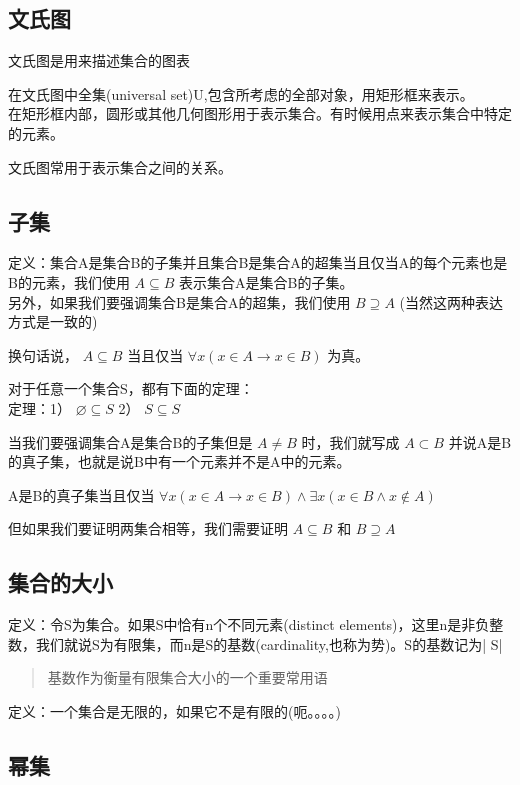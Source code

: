\documentclass[12pt,a4paper,oneside]{ctexart}
\begin{document}
\subsection*{文氏图}

文氏图是用来描述集合的图表

在文氏图中全集(universal set)U,包含所考虑的全部对象，用矩形框来表示。\\
在矩形框内部，圆形或其他几何图形用于表示集合。有时候用点来表示集合中特定的元素。

文氏图常用于表示集合之间的关系。

\subsection*{子集}

定义：集合A是集合B的子集并且集合B是集合A的超集当且仅当A的每个元素也是B的元素，我们使用 \(A\subseteq B\) 表示集合A是集合B的子集。\\
另外，如果我们要强调集合B是集合A的超集，我们使用 \(B\supseteq A\) (当然这两种表达方式是一致的)

换句话说， \(A\subseteq B\) 当且仅当 \(\forall x(x\in A\rightarrow x\in B)\) 为真。

对于任意一个集合S，都有下面的定理：\\
定理：1） \(\varnothing\subseteq S\) 2） \(S\subseteq S\)

当我们要强调集合A是集合B的子集但是 \(A\neq B\) 时，我们就写成 \(A\subset B\) 并说A是B的真子集，也就是说B中有一个元素并不是A中的元素。

A是B的真子集当且仅当 \(\forall x(x\in A\rightarrow x\in B)\wedge\exists x(x\in B\wedge x\notin A)\)

但如果我们要证明两集合相等，我们需要证明 \(A\subseteq B\) 和 \(B\supseteq A\)

\subsection*{集合的大小}

定义：令S为集合。如果S中恰有n个不同元素(distinct elements)，这里n是非负整数，我们就说S为有限集，而n是S的基数(cardinality,也称为势)。S的基数记为| S|

\begin{quote}
基数作为衡量有限集合大小的一个重要常用语
\end{quote}

定义：一个集合是无限的，如果它不是有限的(呃。。。。)

\subsection*{幂集}
\end{document}
